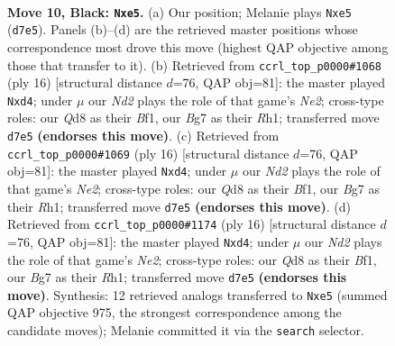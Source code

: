 \documentclass[11pt]{article}
\begin{document}
\clearpage

\begin{figure}[p]\centering
\begin{subfigure}{0.46\textwidth}\centering
\resizebox{\linewidth}{!}{%
\newchessgame
\chessboard[
  setfen={r1bq1rk1/1ppn2bp/p2p1np1/4Pp2/PPP4P/5NP1/4PPB1/RNBQ1RK1 b - - 0 10},
  showmover=false,
  pgfstyle=straightmove, color=movearrow, markmove={d7-e5}
]}
\caption{}
\end{subfigure}\hfill
\begin{subfigure}{0.46\textwidth}\centering
\resizebox{\linewidth}{!}{%
\newchessgame
\chessboard[
  setfen={rnbq1rk1/pp3pbp/2pp1np1/8/2PpP3/2N1BP2/PP1QN1PP/R3KB1R w KQ - 0 9},
  showmover=false,
  pgfstyle=straightmove, color=movearrow, markmove={e2-d4}
]}
\caption{}
\end{subfigure}
\\[4pt]
\begin{subfigure}{0.46\textwidth}\centering
\resizebox{\linewidth}{!}{%
\newchessgame
\chessboard[
  setfen={rnbq1rk1/pp3pbp/2pp1np1/8/2PpP3/2N1BP2/PP1QN1PP/R3KB1R w KQ - 0 9},
  showmover=false,
  pgfstyle=straightmove, color=movearrow, markmove={e2-d4}
]}
\caption{}
\end{subfigure}\hfill
\begin{subfigure}{0.46\textwidth}\centering
\resizebox{\linewidth}{!}{%
\newchessgame
\chessboard[
  setfen={rnbq1rk1/pp3pbp/2pp1np1/8/2PpP3/2N1BP2/PP1QN1PP/R3KB1R w KQ - 0 9},
  showmover=false,
  pgfstyle=straightmove, color=movearrow, markmove={e2-d4}
]}
\caption{}
\end{subfigure}
\caption{\textbf{Move 10, Black: \texttt{Nxe5}.} (a) Our position; Melanie plays \texttt{Nxe5} (\texttt{d7e5}). Panels (b)--(d) are the retrieved master positions whose correspondence most drove this move (highest QAP objective among those that transfer to it). (b) Retrieved from \texttt{ccrl\_top\_p0000\#1068} (ply 16) [structural distance $d$=76, QAP obj=81]: the master played \texttt{Nxd4}; under $\mu$ our \emph{Nd2} plays the role of that game's \emph{Ne2}; cross-type roles: our \emph{Q}d8 as their \emph{B}f1, our \emph{B}g7 as their \emph{R}h1; transferred move \texttt{d7e5} \textbf{(endorses this move)}. (c) Retrieved from \texttt{ccrl\_top\_p0000\#1069} (ply 16) [structural distance $d$=76, QAP obj=81]: the master played \texttt{Nxd4}; under $\mu$ our \emph{Nd2} plays the role of that game's \emph{Ne2}; cross-type roles: our \emph{Q}d8 as their \emph{B}f1, our \emph{B}g7 as their \emph{R}h1; transferred move \texttt{d7e5} \textbf{(endorses this move)}. (d) Retrieved from \texttt{ccrl\_top\_p0000\#1174} (ply 16) [structural distance $d$=76, QAP obj=81]: the master played \texttt{Nxd4}; under $\mu$ our \emph{Nd2} plays the role of that game's \emph{Ne2}; cross-type roles: our \emph{Q}d8 as their \emph{B}f1, our \emph{B}g7 as their \emph{R}h1; transferred move \texttt{d7e5} \textbf{(endorses this move)}. Synthesis: 12 retrieved analogs transferred to \texttt{Nxe5} (summed QAP objective 975, the strongest correspondence among the candidate moves); Melanie committed it via the \texttt{search} selector.}
\label{fig:thought-m19}
\end{figure}
\end{document}
